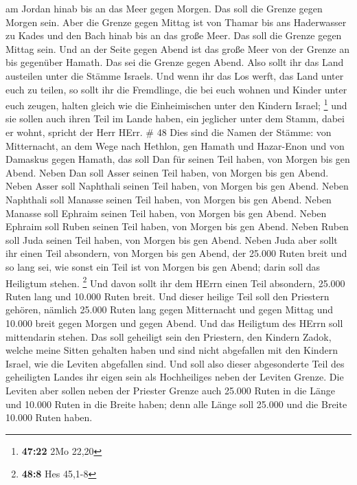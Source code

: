 am Jordan hinab bis an das Meer gegen Morgen. Das soll die Grenze gegen
Morgen sein.  Aber die Grenze gegen Mittag ist von Thamar
bis ans Haderwasser zu Kades und den Bach hinab bis an das große Meer.
Das soll die Grenze gegen Mittag sein.  Und an der Seite
gegen Abend ist das große Meer von der Grenze an bis gegenüber Hamath.
Das sei die Grenze gegen Abend.  Also sollt ihr das Land
austeilen unter die Stämme Israels.  Und wenn ihr das Los
werft, das Land unter euch zu teilen, so sollt ihr die Fremdlinge, die
bei euch wohnen und Kinder unter euch zeugen, halten gleich wie die
Einheimischen unter den Kindern Israel; \footnote{\textbf{47:22} 2Mo
  22,20}  und sie sollen auch ihren Teil im Lande haben,
ein jeglicher unter dem Stamm, dabei er wohnt, spricht der Herr HErr. \#
48  Dies sind die Namen der Stämme: von Mitternacht, an dem
Wege nach Hethlon, gen Hamath und Hazar-Enon und von Damaskus gegen
Hamath, das soll Dan für seinen Teil haben, von Morgen bis gen Abend.
 Neben Dan soll Asser seinen Teil haben, von Morgen bis gen
Abend.  Neben Asser soll Naphthali seinen Teil haben, von
Morgen bis gen Abend.  Neben Naphthali soll Manasse seinen
Teil haben, von Morgen bis gen Abend.  Neben Manasse soll
Ephraim seinen Teil haben, von Morgen bis gen Abend.  Neben
Ephraim soll Ruben seinen Teil haben, von Morgen bis gen Abend.
 Neben Ruben soll Juda seinen Teil haben, von Morgen bis gen
Abend.  Neben Juda aber sollt ihr einen Teil absondern, von
Morgen bis gen Abend, der 25.000 Ruten breit und so lang sei, wie sonst
ein Teil ist von Morgen bis gen Abend; darin soll das Heiligtum stehen.
\footnote{\textbf{48:8} Hes 45,1-8}  Und davon sollt ihr dem
HErrn einen Teil absondern, 25.000 Ruten lang und 10.000 Ruten breit.
 Und dieser heilige Teil soll den Priestern gehören,
nämlich 25.000 Ruten lang gegen Mitternacht und gegen Mittag und 10.000
breit gegen Morgen und gegen Abend. Und das Heiligtum des HErrn soll
mittendarin stehen.  Das soll geheiligt sein den Priestern,
den Kindern Zadok, welche meine Sitten gehalten haben und sind nicht
abgefallen mit den Kindern Israel, wie die Leviten abgefallen sind.
 Und soll also dieser abgesonderte Teil des geheiligten
Landes ihr eigen sein als Hochheiliges neben der Leviten Grenze.
 Die Leviten aber sollen neben der Priester Grenze auch
25.000 Ruten in die Länge und 10.000 Ruten in die Breite haben; denn
alle Länge soll 25.000 und die Breite 10.000 Ruten haben. 
